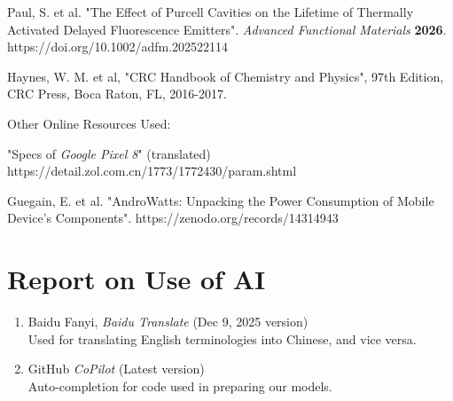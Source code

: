 \documentclass[12pt]{article}
\begin{document}
\noindent [8] Paul, S. et al. "The Effect of Purcell Cavities on the Lifetime of Thermally Activated Delayed Fluorescence Emitters". \textit{Advanced Functional Materials} \textbf{2026}. https://doi.org/10.1002/adfm.202522114

\noindent [11] Haynes, W. M. et al, "CRC Handbook of Chemistry and Physics", 97th Edition, CRC Press, Boca Raton, FL, 2016-2017.
\\
\par Other Online Resources Used:

\noindent [12] "Specs of \textit{Google Pixel 8}" (translated) https://detail.zol.com.cn/1773/1772430/param.shtml

\noindent [13] Guegain, E. et al. "AndroWatts: Unpacking the Power Consumption of Mobile Device's Components". https://zenodo.org/records/14314943

\newpage

\section{Report on Use of AI}

\begin{enumerate}
	\item Baidu Fanyi, \textit{Baidu Translate} (Dec 9, 2025 version)\\
	Used for translating English terminologies into Chinese, and vice versa. 
	\item GitHub \textit{CoPilot} (Latest version) \\
	Auto-completion for code used in preparing our models.
\end{enumerate}




\end{document}
